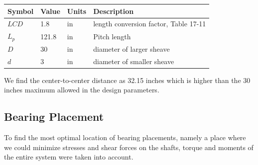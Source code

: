 \documentclass[letterpaper,12pt]{article}
\begin{document}
\begin{center}
	\begin{tabular}{ |p{1.5cm}||p{1cm}|p{2cm}|p{7cm}|  }
		\hline
		Symbol & Value & Units & Description\\
		\hline
		$LCD$ &1.8& in & length conversion factor, Table 17-11\\
		$L_p$ & 121.8 & in & Pitch length \\
        $D$ & 30 & in  & diameter of larger sheave\\			
		$d$ & 3 & in  & diameter of smaller sheave\\
		\hline
	\end{tabular}
\end{center}
We find the center-to-center distance as 32.15 inches which is higher than the 30 inches maximum allowed in the design parameters.

\subsection{Bearing Placement}
To find the most optimal location of bearing placements, namely a place where we could minimize stresses and shear forces on the shafts, torque and moments of the entire system were taken into account.
\end{document}
